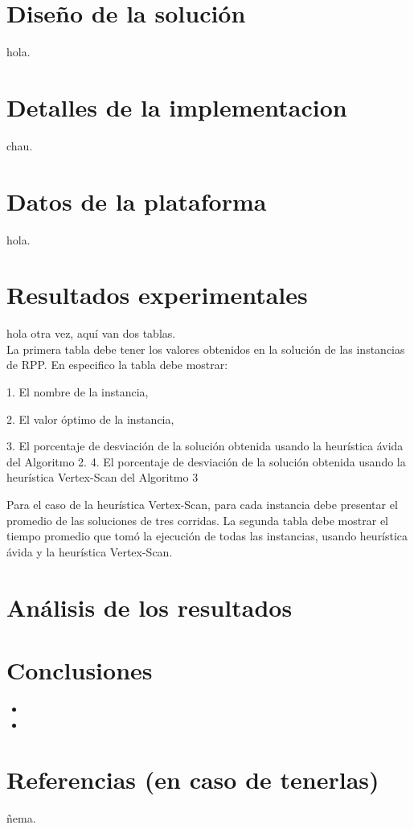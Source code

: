 \documentclass[11pt]{article}
\begin{document}
\section{Diseño de la solución}

hola. \\


\section{Detalles de la implementacion}

chau. \\


\section{Datos de la plataforma}

hola. \\

\section{Resultados experimentales}

hola otra vez, aquí van dos tablas. \\

La primera tabla debe tener los valores obtenidos en la solución de las instancias de
RPP. En especifico la tabla debe mostrar:

1. El nombre de la instancia,

2. El valor óptimo de la instancia,

3. El porcentaje de desviación de la solución obtenida usando la heurística ávida del
Algoritmo 2.
4. El porcentaje de desviación de la solución obtenida usando la heurística Vertex-Scan
del Algoritmo 3

Para el caso de la heurística Vertex-Scan, para cada instancia debe presentar el promedio
de las soluciones de tres corridas.
La segunda tabla debe mostrar el tiempo promedio que tomó la ejecución de todas las
instancias, usando heurística ávida y la heurística Vertex-Scan.
\section{Análisis de los resultados}


\section{Conclusiones}

\begin{itemize}
   \item 
   \item 
\end{itemize}

\section{Referencias (en caso de tenerlas)}

ñema. \\
\end{document}
